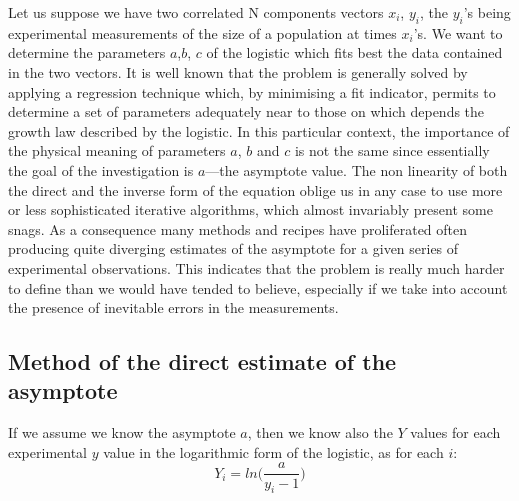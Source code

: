 \documentclass[%
 aip,
 jmp,%
 amsmath,amssymb,
 reprint,%
]{revtex4-1}
\begin{document}
Let us suppose we have two correlated N components vectors $x_i$,  $y_i$, the  $y_i$'s being experimental measurements of the size of a population at times $x_i$'s.  We want to  determine the  parameters $a$,$b$, $c$ of  the logistic which fits best the data contained in the two vectors. It is well  known that  the problem is  generally solved  by applying  a regression technique which, by  minimising a fit  indicator, permits  to determine a set of parameters adequately near to those on which  depends the growth law described by the logistic. In this particular context, the  importance of the  physical meaning  of parameters $a$, $b$ and $c$ is not the  same since essentially the goal of the investigation is  $a$---the asymptote value.
The non  linearity of  both  the direct  and the  inverse  form  of  the equation oblige  us in any case to use more or less sophisticated iterative algorithms, which almost invariably present some snags. As a consequence many methods and recipes have proliferated often producing quite diverging estimates of the  asymptote for a  given  series  of experimental observations. This  indicates that  the problem is really much harder to define than we  would have tended to believe, especially if we take into account the presence of inevitable errors in the measurements.

\subsection{\label{sec:level2}Method of the direct estimate of the asymptote}

If we assume we know the asymptote $a$, then we know also the $Y$ values for each experimental $y$ value in the logarithmic form of the logistic, as for each  $i$: \[ Y_i = ln \Big(\frac{a}{y_i - 1}\Big) \]
	
\end{document}
